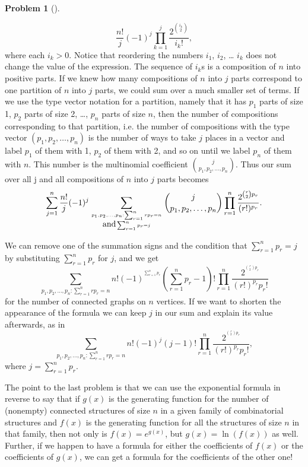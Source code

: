 \documentclass[10pt,]{book}
\theoremstyle{plain}
\theoremstyle{definition}
\newtheorem{activity}[project]{Problem}
\theoremstyle{definition}
\numberwithin{equation}{chapter}
\begin{document}
\begin{activity}[]
\begin{enumerate}[font=\bfseries,label=(\alph*),ref=\alph*]
\begin{equation*}
\frac{n!}{j}(-1)^j\prod_{k=1}^j \frac{2^{\binom{i_k}{2}}
}{i_k!},
\end{equation*}
where each \(i_k>0\). Notice that reordering the numbers \(i_1\), \(i_2\), \dots{} \(i_k\) does not change the value of the expression. The sequence of \(i_k\)s is a composition of \(n\) into positive parts. If we knew how many compositions of \(n\) into \(j\) parts correspond to one partition of \(n\) into \(j\) parts, we could sum over a much smaller set of terms. If we use the type vector notation for a partition, namely that it has \(p_1\) parts of size 1, \(p_2\) parts of size 2, \dots{}, \(p_n\) parts of size \(n\), then the number of compositions corresponding to that partition, i.e. the number of compositions with the type vector \((p_1,p_2, \ldots, p_n)\) is the number of ways to take \(j\) places in a vector and label \(p_1\) of them with 1, \(p_2\) of them with 2, and so on until we label \(p_n\) of them with \(n\). This number is the multinomial coefficient \(\binom{j}{p_1,p_2,\ldots, p_n}\). Thus our sum over all j and all compositions of \(n\) into \(j\) parts becomes%
\begin{equation*}
\sum_{j=1}^n \frac{n!}{j}(-1)^j\sum_{{p_1,p_2,\ldots,p_n: \sum_{r=1}^n
rp_r =n \atop \mbox{and}  \sum_{r=1}^n p_r =j}}\binom{j}{p_1, p_2, \ldots,
p_n}
\prod_{r=1}^n\frac{2^{{\binom{r}{2}p_r}}
}{(r!)^{p_r}}.
\end{equation*}
%
\par
We can remove one of the summation signs and the condition that \(\sum_{r=1}^n p_r=j\) by substituting \(\sum_{r=1}^n p_r\) for \(j\), and we get%
\begin{equation*}
\sum_{{p_1,p_2,\ldots,p_n: \sum_{r=1}^n
rp_r =n }}{n!}(-1)^{^{\sum_{r=1}^n p_r}}\left(\sum_{r=1}^n p_r -1\right)!
\prod_{r=1}^n\frac{2^{^{\binom{r}{2}p_r}}
}{(r!)^{p_r}p_r!}
\end{equation*}
for the number of connected graphs on \(n\) vertices. If we want to shorten the appearance of the formula we can keep \(j\) in our sum and explain its value afterwards, as in%
\begin{equation*}
\sum_{{p_1,p_2,\ldots,p_n: \sum_{r=1}^n
rp_r =n }}{n!}(-1)^j(j-1)!
\prod_{r=1}^n \frac{2^{^{\binom{r}{2}p_r}}
}{(r!)^{p_r}p_r!},
\end{equation*}
where \(j=\sum_{r=1}^n p_r\).%
\end{enumerate}
\end{activity}
The point to the last problem is that we can use the exponential formula in reverse to say that if \(g(x)\) is the generating function for the number of (nonempty) connected structures of size \(n\) in a given family of combinatorial structures and \(f(x)\) is the generating function for all the structures of size \(n\) in that family, then not only is \(f(x) =
e^{g(x)}\), but \(g(x) = \ln(f(x))\) as well. Further, if we happen to have a formula for either the coefficients of \(f(x)\) or the coefficients of \(g(x)\), we can get a formula for the coefficients of the other one!%
\typeout{************************************************}
\typeout{************************************************}
\end{document}
